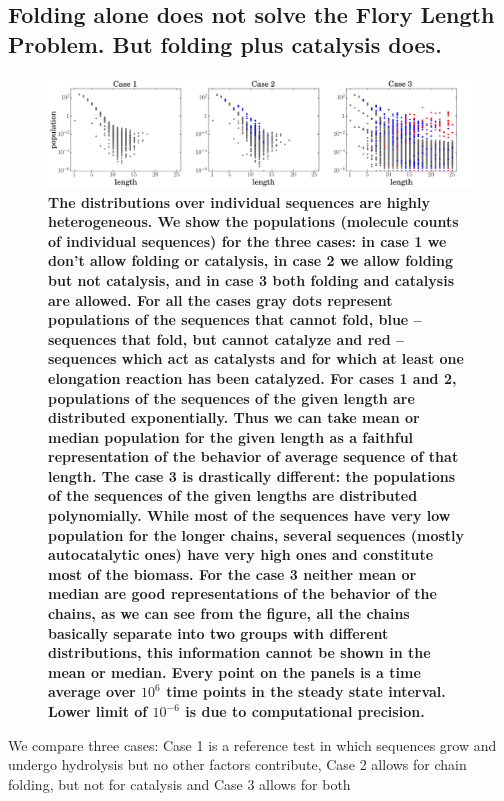 \documentclass[journal=jacsat,manuscript=article,layout=twocolumn]{achemso}
\begin{document}
\subsection{Folding alone does not solve the Flory Length Problem.  But folding plus catalysis 
does.}
\begin{figure}[htb!]
  \centering
  \includegraphics[width=\textwidth]{pictures/scatter-all-three.pdf}
  \caption{\footnotesize{\textbf{\bf{The distributions over individual sequences are highly 
heterogeneous.}  We show the populations (molecule counts of individual 
sequences) for the three cases: in case 1 we don't allow folding or catalysis, in case 2 
we allow folding but not catalysis, and in case 3 both folding and catalysis are allowed. For 
all the cases gray dots represent populations of the sequences that cannot fold, 
blue -- sequences that fold, but cannot 
catalyze and red -- sequences which act as catalysts and for which at least one elongation 
reaction 
has been catalyzed.  For cases 1 and 2, populations of the sequences of the given length are 
distributed exponentially. Thus we can take mean or median population for the given length as a 
faithful representation of the behavior of average sequence of that length. The case 3 is 
drastically different: the populations of the sequences of the given lengths are distributed 
polynomially. While most of the sequences have very low population for the longer chains, 
several sequences (mostly autocatalytic ones) have very high ones and constitute most of the 
biomass. 
For the case 3 neither mean or median are good representations of the behavior of the chains, 
as we can see from the figure, all the chains basically separate into two groups with different 
distributions, this information cannot be shown in the mean or median.  Every 
point on the panels is a time average over $10^6$ time points in the steady state interval. Lower 
limit of $10^{-6}$ is due to computational precision.}}}
  \label{fig:stats-scatter-018}
\end{figure}
 We compare three cases:  Case 1 is a reference test in which sequences grow and undergo 
hydrolysis 
but no other factors 
contribute, Case 2 allows for chain folding, but not for catalysis and Case 3 allows for both 
\end{document}
